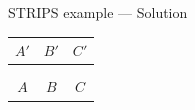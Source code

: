 \begin{frame}[fragile]{STRIPS example --- Solution}
	\begin{center}
			\begin{tabular}{c|c|c}
				  $A'$  &   $B'$  &   $C'$  \\\hline
				\emptyy & \banana\monkey & \emptyy \\
				\emptyy & \boxbox & \emptyy \\\hline
				  $A$   &   $B$   &    $C$
			\end{tabular}
	\end{center}
\end{frame}

